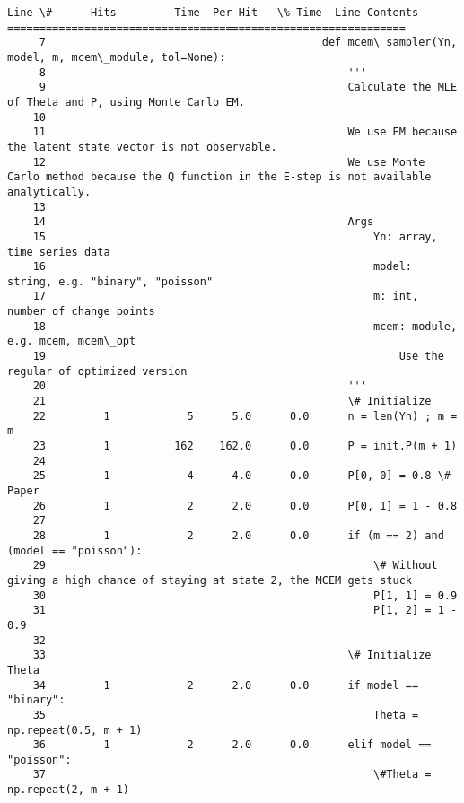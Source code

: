 \documentclass{article}
\begin{document}
\begin{Verbatim}[commandchars=\\\{\}]
Line \#      Hits         Time  Per Hit   \% Time  Line Contents
==============================================================
     7                                           def mcem\_sampler(Yn, model, m, mcem\_module, tol=None):
     8                                               '''
     9                                               Calculate the MLE of Theta and P, using Monte Carlo EM.
    10                                               
    11                                               We use EM because the latent state vector is not observable.
    12                                               We use Monte Carlo method because the Q function in the E-step is not available analytically.
    13                                           
    14                                               Args
    15                                                   Yn: array, time series data
    16                                                   model: string, e.g. "binary", "poisson"
    17                                                   m: int, number of change points
    18                                                   mcem: module, e.g. mcem, mcem\_opt
    19                                                       Use the regular of optimized version
    20                                               '''
    21                                               \# Initialize
    22         1            5      5.0      0.0      n = len(Yn) ; m = m
    23         1          162    162.0      0.0      P = init.P(m + 1)
    24                                           
    25         1            4      4.0      0.0      P[0, 0] = 0.8 \# Paper
    26         1            2      2.0      0.0      P[0, 1] = 1 - 0.8
    27                                           
    28         1            2      2.0      0.0      if (m == 2) and (model == "poisson"):
    29                                                   \# Without giving a high chance of staying at state 2, the MCEM gets stuck
    30                                                   P[1, 1] = 0.9
    31                                                   P[1, 2] = 1 - 0.9
    32                                           
    33                                               \# Initialize Theta
    34         1            2      2.0      0.0      if model == "binary":
    35                                                   Theta = np.repeat(0.5, m + 1)
    36         1            2      2.0      0.0      elif model == "poisson":
    37                                                   \#Theta = np.repeat(2, m + 1)

\end{Verbatim}
\end{document}

